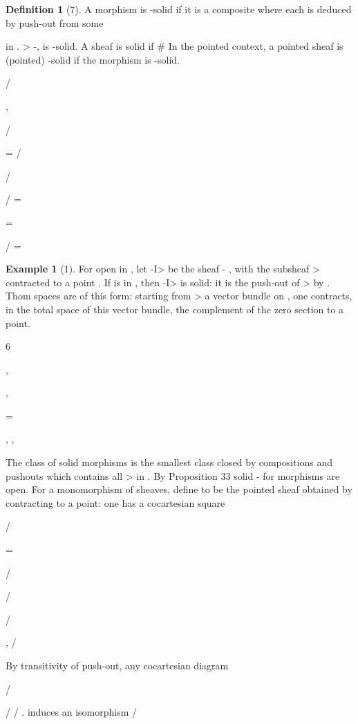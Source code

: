 \documentclass[11pt,a4paper]{article}
\theoremstyle{plain}
\theoremstyle{definition}
\newtheorem{definition}[theorem]{Definition}
\newtheorem{example}[theorem]{Example}
\begin{document}
\begin{definition}[7]
A morphism
is -solid if it is a composite
where each 
  is deduced by push-out from some

 in .
>
-,
is -solid.
A sheaf is solid if \#
In the pointed context, a pointed sheaf is (pointed) -solid if the morphism
is -solid.

/

,

/

  =
/

/

/ =

=

/ =





\end{definition}

\begin{example}[1]
For open in , let -I> be the sheaf - , with the subsheaf > contracted to a point . If
is in , then
-I> is solid: it is the
push-out of >
by
.
Thom
spaces
are
of
this
form: starting from
>
a vector bundle on , one contracts, in the total space of this vector bundle, the
complement of the zero section to a point.

6

,







,

=

, ,

The class of solid morphisms is the smallest class closed by compositions and pushouts which contains all >
 in . By Proposition 33 solid
- for
morphisms are open.
For
a monomorphism of sheaves, define
to be the pointed sheaf
obtained by contracting to a point: one has a cocartesian square



/



=

/

/

/ 







,  /



By transitivity of push-out, any cocartesian diagram

/ 







/   
/  .
induces an isomorphism /
\end{example}
\end{document}
